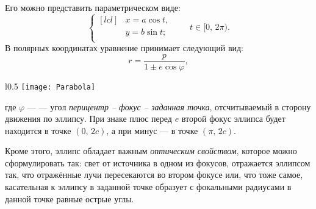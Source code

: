 Его можно представить параметрическом виде:\begin{equation}
\left\{\begin{aligned}[lcl]
&x=a\cos t,\\
&y=b\sin t;\\
\end{aligned}
\right. \quad\quad t \in [0, \, 2\pi).
\end{equation}
В полярных координатах уравнение принимает следующий вид:
\begin{equation}
r=\frac{p}{1\pm e \cos \varphi},
\label{eq:ellipse-pol-eq}
\end{equation} 
\begin{wrapfigure}[11]{l}{0.5\tw}
	\centering
	\vspace{-.7pc}
	\texttt{[image: Parabola]}
\end{wrapfigure}
где $\varphi$ ---  --- угол 
{\slshape перицентр -- фокус -- заданная точка}, 
отсчитываемый в сторону движения по эллипсу. При 
знаке плюс перед $e$ второй фокус эллипса будет 
находится в точке $(0, \, 2c)$, а при минус --- в 
точке $(\pi, \, 2c)$.

Кроме этого, эллипс обладает важным {\itshape оптическим 
свойством}, которое можно сформулировать так: свет от источника в одном из фокусов, 
	отражается эллипсом так, что отражённые лучи пересекаются 
	во втором фокусе или, что тоже самое, касательная к эллипсу в заданной точке образует с фокальными радиусами в данной точке равные острые углы.






 
